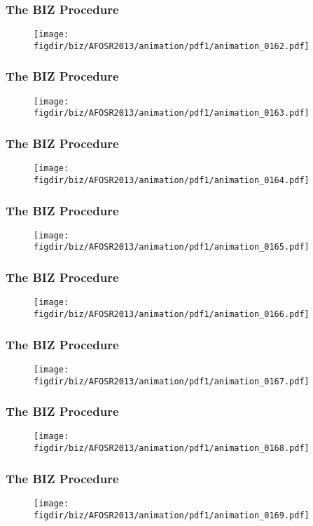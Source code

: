 \documentclass[13pt]{beamer}
\newcommand{\figdir}{../../fig}
\begin{document}
{\begin{frame}\frametitle{The BIZ Procedure}\begin{figure}\texttt{[image: \\figdir/biz/AFOSR2013/animation/pdf1/animation\_0162.pdf]}\end{figure}\end{frame}
\begin{frame}\frametitle{The BIZ Procedure}\begin{figure}\texttt{[image: \\figdir/biz/AFOSR2013/animation/pdf1/animation\_0163.pdf]}\end{figure}\end{frame}
\begin{frame}\frametitle{The BIZ Procedure}\begin{figure}\texttt{[image: \\figdir/biz/AFOSR2013/animation/pdf1/animation\_0164.pdf]}\end{figure}\end{frame}
\begin{frame}\frametitle{The BIZ Procedure}\begin{figure}\texttt{[image: \\figdir/biz/AFOSR2013/animation/pdf1/animation\_0165.pdf]}\end{figure}\end{frame}
\begin{frame}\frametitle{The BIZ Procedure}\begin{figure}\texttt{[image: \\figdir/biz/AFOSR2013/animation/pdf1/animation\_0166.pdf]}\end{figure}\end{frame}
\begin{frame}\frametitle{The BIZ Procedure}\begin{figure}\texttt{[image: \\figdir/biz/AFOSR2013/animation/pdf1/animation\_0167.pdf]}\end{figure}\end{frame}
\begin{frame}\frametitle{The BIZ Procedure}\begin{figure}\texttt{[image: \\figdir/biz/AFOSR2013/animation/pdf1/animation\_0168.pdf]}\end{figure}\end{frame}
\begin{frame}\frametitle{The BIZ Procedure}\begin{figure}\texttt{[image: \\figdir/biz/AFOSR2013/animation/pdf1/animation\_0169.pdf]}\end{figure}\end{frame}
}
\end{document}
